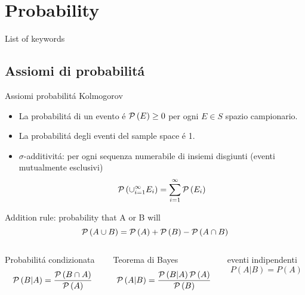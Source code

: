 \section{Probability}

\begin{frame}[allowframebreaks]{List of keywords}
\listofkeywords
\end{frame}


\subsection{Assiomi di probabilit\'a}

\begin{frame}{Assiomi probabilit\'a Kolmogorov}
\begin{itemize}
\item La probabilit\'a di un evento \'e $\operatorname{\mathcal{P}}{(E)}\geq0$ per ogni $E\in S$ spazio campionario.
\item La probabilit\'a degli eventi del sample space \'e 1.
\item $\sigma$-additivit\'a: per ogni sequenza numerabile di insiemi disgiunti (eventi mutualmente esclusivi)
\begin{equation*}
\operatorname{\mathcal{P}}{(\cup_{i=1}^{\infty}E_i)}=\sum_{i=1}^{\infty}\operatorname{\mathcal{P}}{(E_i)}
\end{equation*}
\end{itemize}
\begin{block}{Addition rule: probability that A or B will}
\begin{equation*}
\operatorname{\mathcal{P}}{(A\cup B)}=\operatorname{\mathcal{P}}{(A)}+\operatorname{\mathcal{P}}{(B)}-\operatorname{\mathcal{P}}{(A\cap B)}
\end{equation*}
\end{block}
\begin{columns}[T]
\begin{column}{0.3\textwidth}
\begin{block}{Probabilit\'a condizionata}
\[\operatorname{\mathcal{P}}{(B|A)}=\frac{\operatorname{\mathcal{P}}{(B\cap A)}}{\operatorname{\mathcal{P}}{(A)}}
\]
\end{block}
\end{column}
\begin{column}{0.4\textwidth}
\begin{block}{Teorema di Bayes}
\[\operatorname{\mathcal{P}}{(A|B)}=\frac{\operatorname{\mathcal{P}}{(B|A)}\operatorname{\mathcal{P}}{(A)}}{\operatorname{\mathcal{P}}{(B)}}\]
\end{block}
\end{column}
\begin{column}{0.25\textwidth}
\begin{block}{eventi indipendenti}
    \[P(A|B)=P(A)\]
    \end{block}
    \end{column}
\end{columns}
\end{frame}

